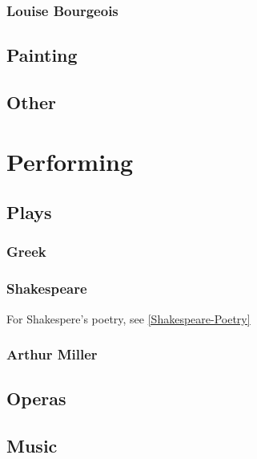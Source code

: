 			\subsubsection{Louise Bourgeois}
			
		\subsection{Painting}
		\subsection{Other}

	\section{Performing}
		\subsection{Plays}
			\subsubsection{Greek}
			\subsubsection{Shakespeare} \label{Shakespeare-Play} For Shakespere's poetry, see \ref{Shakespeare-Poetry}
			\subsubsection{Arthur Miller}
			
		\subsection{Operas}
		\subsection{Music}